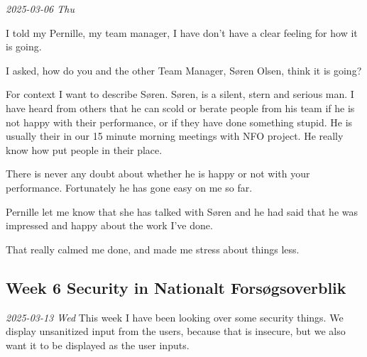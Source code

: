 \documentclass[../main.tex]{subfiles}
\begin{document}
\textit{2025-03-06 Thu}




I told my Pernille, my team manager, I have don't have a clear feeling for how it is going.

I asked, how do you and the other Team Manager, Søren Olsen, think it is going?

For context I want to describe Søren. Søren, is a silent, stern and serious man. I have heard from others that he can scold or berate people from his team if he is not happy with their performance, or if they have done something stupid. He is usually their in our 15 minute morning meetings with NFO project. He really know how put people in their place.

There is never any doubt about whether he is happy or not with your performance. Fortunately he has gone easy on me so far.

Pernille let me know that she has talked with Søren and he had said that he was impressed and happy about the work I've
done.

That really calmed me done, and made me stress about things less. \\

\subsection{Week 6 Security in Nationalt Forsøgsoverblik}
\textit{2025-03-13 Wed}
This week I have been looking over some security things. We display unsanitized input from the users, because that is insecure, but we also want it to be displayed as the user inputs.
\end{document}
